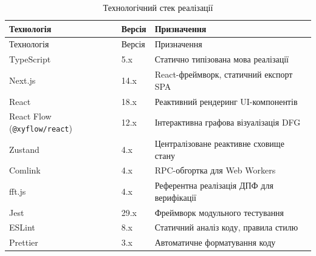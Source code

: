 \begin{longtable}[]{@{}
  >{\raggedright\arraybackslash}p{}
  >{\raggedright\arraybackslash}p{}
  >{\raggedright\arraybackslash}p{}@{}}
\caption{\protect{}\label{tab:tech_stack}{}Технологічний
стек реалізації}\tabularnewline
\toprule\noalign{}
\begin{minipage}[b]{\linewidth}\raggedright
Технологія
\end{minipage} & \begin{minipage}[b]{\linewidth}\raggedright
Версія
\end{minipage} & \begin{minipage}[b]{\linewidth}\raggedright
Призначення
\end{minipage} \\
\midrule\noalign{}
\endfirsthead
\toprule\noalign{}
\begin{minipage}[b]{\linewidth}\raggedright
Технологія
\end{minipage} & \begin{minipage}[b]{\linewidth}\raggedright
Версія
\end{minipage} & \begin{minipage}[b]{\linewidth}\raggedright
Призначення
\end{minipage} \\
\midrule\noalign{}
\endhead
\bottomrule\noalign{}
\endlastfoot
TypeScript & 5.x & Статично типізована мова реалізації \\
Next.js & 14.x & React-фреймворк, статичний експорт SPA \\
React & 18.x & Реактивний рендеринг UI-компонентів \\
React Flow (\texttt{@xyflow/react}) & 12.x & Інтерактивна графова
візуалізація DFG \\
Zustand & 4.x & Централізоване реактивне сховище стану \\
Comlink & 4.x & RPC-обгортка для Web Workers \\
fft.js & 4.x & Референтна реалізація ДПФ для верифікації \\
Jest & 29.x & Фреймворк модульного тестування \\
ESLint & 8.x & Статичний аналіз коду, правила стилю \\
Prettier & 3.x & Автоматичне форматування коду \\
\end{longtable}

